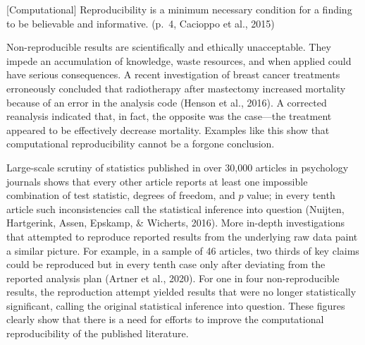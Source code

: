 \documentclass[
  english,
  ,man,floatsintext]{apa6}
\begin{document}
\begin{displayquote}
{[}Computational{]} Reproducibility is a minimum necessary condition for a finding to be believable and informative.
(p.~4, Cacioppo et al., 2015)
\end{displayquote}

Non-reproducible results are scientifically and ethically unacceptable.
They impede an accumulation of knowledge, waste resources, and when applied could have serious consequences.
A recent investigation of breast cancer treatments erroneously concluded that radiotherapy after mastectomy increased mortality because of an error in the analysis code (Henson et al., 2016).
A corrected reanalysis indicated that, in fact, the opposite was the case---the treatment appeared to be effectively decrease mortality.
Examples like this show that computational reproducibility cannot be a forgone conclusion.

Large-scale scrutiny of statistics published in over 30,000 articles in psychology journals shows that every other article reports at least one impossible combination of test statistic, degrees of freedom, and \(p\) value; in every tenth article such inconsistencies call the statistical inference into question (Nuijten, Hartgerink, Assen, Epskamp, \& Wicherts, 2016).
More in-depth investigations that attempted to reproduce reported results from the underlying raw data paint a similar picture.
For example, in a sample of 46 articles, two thirds of key claims could be reproduced but in every tenth case only after deviating from the reported analysis plan (Artner et al., 2020).
For one in four non-reproducible results, the reproduction attempt yielded results that were no longer statistically significant, calling the original statistical inference into question.
These figures clearly show that there is a need for efforts to improve the computational reproducibility of the published literature.
\end{document}

